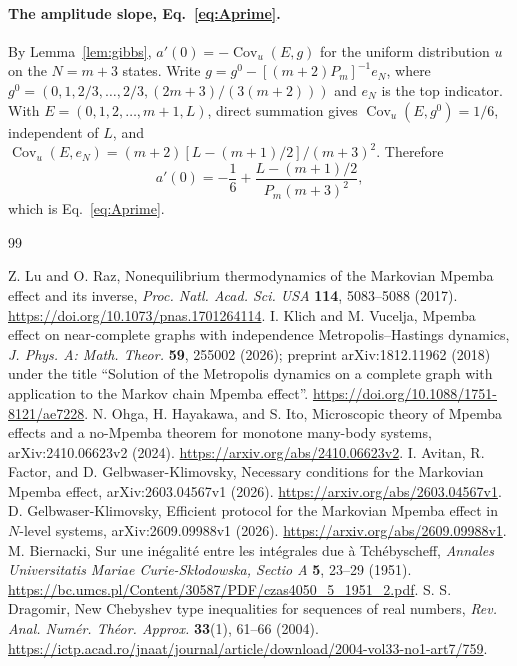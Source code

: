 \documentclass[11pt,a4paper]{article}
\theoremstyle{remark}\newtheorem{remark}[theorem]{Remark}
\newcommand{\Cov}{\operatorname{Cov}}
\begin{document}
\paragraph{The amplitude slope, Eq.~\eqref{eq:Aprime}.} By Lemma~\ref{lem:gibbs}, $a'(0)=-\Cov_u(E,g)$ for the uniform distribution $u$ on the $N=m+3$ states. Write $g=g^0-[(m+2)P_m]^{-1}e_N$, where $g^0=(0,1,2/3,\ldots,2/3,(2m+3)/(3(m+2)))$ and $e_N$ is the top indicator. With $E=(0,1,2,\ldots,m+1,L)$, direct summation gives $\Cov_u(E,g^0)=1/6$, independent of $L$, and $\Cov_u(E,e_N)=(m+2)[L-(m+1)/2]/(m+3)^2$. Therefore
\begin{equation}
 a'(0)=-\frac16+\frac{L-(m+1)/2}{P_m(m+3)^2},
\end{equation}
which is Eq.~\eqref{eq:Aprime}.

\begin{thebibliography}{99}\raggedright
{}
Z. Lu and O. Raz, Nonequilibrium thermodynamics of the Markovian Mpemba effect and its inverse, \emph{Proc. Natl. Acad. Sci. USA} \textbf{114}, 5083--5088 (2017). \url{https://doi.org/10.1073/pnas.1701264114}.
I. Klich and M. Vucelja, Mpemba effect on near-complete graphs with independence Metropolis--\allowbreak Hastings dynamics, \emph{J. Phys. A: Math. Theor.} \textbf{59}, 255002 (2026); preprint arXiv:1812.11962 (2018) under the title ``Solution of the Metropolis dynamics on a complete graph with application to the Markov chain Mpemba effect''. \url{https://doi.org/10.1088/1751-8121/ae7228}.
N. Ohga, H. Hayakawa, and S. Ito, Microscopic theory of Mpemba effects and a no-Mpemba theorem for monotone many-body systems, arXiv:2410.06623v2 (2024). \url{https://arxiv.org/abs/2410.06623v2}.
I. Avitan, R. Factor, and D. Gelbwaser-Klimovsky, Necessary conditions for the Markovian Mpemba effect, arXiv:2603.04567v1 (2026). \url{https://arxiv.org/abs/2603.04567v1}.
D. Gelbwaser-Klimovsky, Efficient protocol for the Markovian Mpemba effect in $N$-level systems, arXiv:2609.09988v1 (2026). \url{https://arxiv.org/abs/2609.09988v1}.
M. Biernacki, Sur une in\'egalit\'e entre les int\'egrales due \`a Tch\'ebyscheff, \emph{Annales Universitatis Mariae Curie-Sk\l odowska, Sectio A} \textbf{5}, 23--29 (1951). \url{https://bc.umcs.pl/Content/30587/PDF/czas4050_5_1951_2.pdf}.
S. S. Dragomir, New Chebyshev type inequalities for sequences of real numbers, \emph{Rev. Anal. Num\'er. Th\'eor. Approx.} \textbf{33}(1), 61--66 (2004). \url{https://ictp.acad.ro/jnaat/journal/article/download/2004-vol33-no1-art7/759}.

\end{thebibliography}
\end{document}
